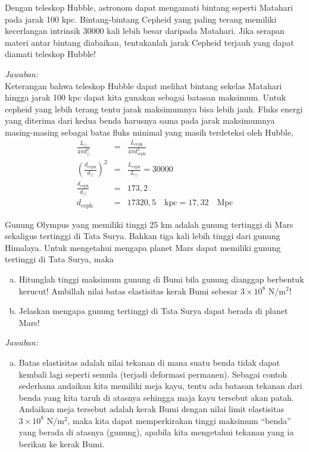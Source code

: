 \documentclass[11pt,fleqn, a4paper]{exam}
\begin{document}
\begin{questions}
\vspace{0.5cm}
\question Dengan teleskop Hubble, astronom dapat mengamati bintang seperti Matahari pada jarak 100 kpc. Bintang-bintang Cepheid yang paling terang memiliki kecerlangan intrinsik 30000 kali lebih besar daripada Matahari. Jika serapan materi antar bintang diabaikan, tentukanlah jarak Cepheid terjauh yang dapat diamati teleskop Hubble!

\textit{Jawaban: }\\
Keterangan bahwa teleskop Hubble dapat melihat bintang sekelas Matahari hingga jarak 100 kpc dapat kita gunakan sebagai batasan maksimum. Untuk cepheid yang lebih terang tentu jarak maksimumnya bisa lebih jauh. Fluks energi yang diterima dari kedua benda harusnya sama pada jarak maksimumnya masing-masing sebagai batas fluks minimal yang masih terdeteksi oleh Hubble,
\begin{eqnarray*}
\frac{L_{\odot}}{4 \pi d_{\odot}^2} &=& \frac{L_{\text{ceph}}}{4 \pi d_{\text{ceph}}^2}\\
\left( \frac{d_{\text{ceph}}}{d_{\odot}} \right)^2 &=& \frac{L_{\text{ceph}}}{L_{\odot}} = 30000\\
\frac{d_{\text{ceph}}}{d_{\odot}} &=& 173,2 \\
d_{\text{ceph}} &=& 17320,5 \quad \text{kpc} = 17,32 \quad \text{Mpc}  
\end{eqnarray*}


\vspace{0.5cm}
\question Gunung Olympus yang memiliki tinggi 25 km adalah gunung tertinggi di Mars sekaligus tertinggi di Tata Surya. Bahkan tiga kali lebih tinggi dari gunung Himalaya. Untuk mengetahui mengapa planet Mars dapat memiliki gunung tertinggi di Tata Surya, maka
\begin{enumerate}[(a)]
\item Hitunglah tinggi maksimum gunung di Bumi bila gunung dianggap berbentuk kerucut! Ambillah nilai batas elastisitas kerak Bumi sebesar $3 \times 10^8$ N/m$^{2}$!
\item Jelaskan mengapa gunung tertinggi di Tata Surya dapat berada di planet Mars!
\end{enumerate} 

\textit{Jawaban: }\\
\begin{enumerate}[a.]
\item Batas elastisitas adalah nilai tekanan di mana suatu benda tidak dapat kembali lagi seperti semula (terjadi deformasi permanen). Sebagai contoh sederhana andaikan kita memiliki meja kayu, tentu ada batasan tekanan dari benda yang kita taruh di atasnya sehingga maja kayu tersebut akan patah. Andaikan meja tersebut adalah kerak Bumi dengan nilai limit elastisitas $3 \times 10^8$ N/m$^{2}$, maka kita dapat memperkirakan tinggi maksimum ``benda'' yang berada di atasnya (gunung), apabila kita mengetahui tekanan yang ia berikan ke kerak Bumi.


\end{enumerate}
\end{questions}
\end{document}
